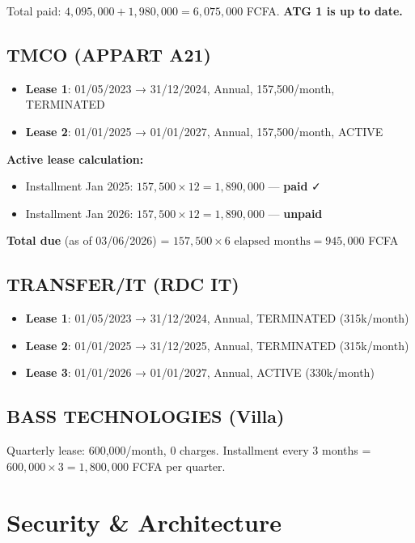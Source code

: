 \documentclass[a4paper,11pt]{article}
\begin{document}
Total paid: $4{,}095{,}000 + 1{,}980{,}000 = 6{,}075{,}000$ FCFA. \textbf{ATG 1 is up to date.}

\subsection{TMCO (APPART A21)}

\begin{itemize}
  \item \textbf{Lease 1}: 01/05/2023 → 31/12/2024, Annual, 157,500/month, TERMINATED
  \item \textbf{Lease 2}: 01/01/2025 → 01/01/2027, Annual, 157,500/month, ACTIVE
\end{itemize}

\textbf{Active lease calculation:}
\begin{itemize}
  \item Installment Jan 2025: $157{,}500 \times 12 = 1{,}890{,}000$ — \textbf{paid} ✓
  \item Installment Jan 2026: $157{,}500 \times 12 = 1{,}890{,}000$ — \textbf{unpaid}
\end{itemize}

\textbf{Total due} (as of 03/06/2026) = $157{,}500 \times 6 \text{ elapsed months} = 945{,}000$ FCFA

\subsection{TRANSFER/IT (RDC IT)}

\begin{itemize}
  \item \textbf{Lease 1}: 01/05/2023 → 31/12/2024, Annual, TERMINATED (315k/month)
  \item \textbf{Lease 2}: 01/01/2025 → 31/12/2025, Annual, TERMINATED (315k/month)
  \item \textbf{Lease 3}: 01/01/2026 → 01/01/2027, Annual, ACTIVE (330k/month)
\end{itemize}

\subsection{BASS TECHNOLOGIES (Villa)}

Quarterly lease: 600,000/month, 0 charges. Installment every 3 months = $600{,}000 \times 3 = 1{,}800{,}000$ FCFA per quarter.

\section{Security \& Architecture}
\end{document}
